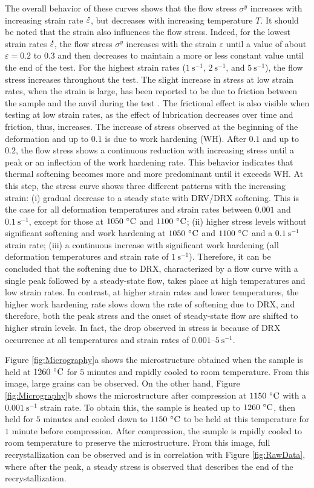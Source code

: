 \documentclass[metals,article,accept,pdftex,moreauthors]{Definitions/mdpi}
\DeclareRobustCommand{\mdot}[1]{\accentset{\mbox{\bfseries .}}{#1}}
\DeclareRobustCommand{\ps}{\text{s}^{-1}}
\begin{document}
The overall behavior of these curves shows that the flow stress $\sigma^y$ increases with increasing strain rate $\mdot\varepsilon$, but decreases with increasing temperature $T$.
It should be noted that the strain also influences the flow stress.
Indeed, for the lowest strain rates $\mdot\varepsilon$, the flow stress $\sigma^y$ increases with the strain $\varepsilon$ until a value of about $\varepsilon=0.2$ to $0.3$ and then decreases to maintain a more or less constant value until the end of the test.
For the highest strain rates ($1~\ps$, $2~\ps$, and $5~\ps$), the flow stress increases throughout the test.
The slight increase in stress at low strain rates, when the strain is large, has been reported to be due to friction between the sample and the anvil during the test \cite{galos2022review}.
The frictional effect is also visible when testing at low strain rates, as the effect of lubrication decreases over time and friction, thus, increases.
The increase of stress observed at the beginning of the deformation and up to $0.1$ is due to work hardening (WH).
After $0.1$ and up to $0.2$, the flow stress shows a continuous reduction with increasing stress until a peak or an inflection of the work hardening rate.
This behavior indicates that thermal softening becomes more and more predominant until it exceeds WH.
At this step, the stress curve shows three different patterns with the increasing strain: (i) gradual decrease to a steady state with DRV/DRX softening.
This is the case for all deformation temperatures and strain rates between $0.001$ and $0.1~\ps$, except for those at $1050~\celsius$ and $1100~\celsius$; (ii) higher stress levels without significant softening and work hardening at $1050~\celsius$ and $1100~\celsius$ and a $0.1~\ps$ strain rate; (iii) a continuous increase with significant work hardening (all deformation temperatures and strain rate of $1~\ps$).
Therefore, it can be concluded that the softening due to DRX, characterized by a flow curve with a single peak followed by a steady-state flow, takes place at high temperatures and low strain rates.
In contrast, at higher strain rates and lower temperatures, the higher work hardening rate slows down the rate of softening due to DRX, and therefore, both the peak stress and the onset of steady-state flow are shifted to higher strain levels.
In fact, the drop observed in
stress is because of DRX occurrence at all temperatures and strain rates of $0.001$--$5~\ps$.

Figure \ref{fig:Micrography}a shows the microstructure obtained when the sample is held at $1260~\celsius$ for $5$ minutes and rapidly cooled to room temperature. From this image, large grains can be observed.
On the other hand, Figure \ref{fig:Micrography}b shows the microstructure after compression at $1150~\celsius$ with a $0.001~\ps$ strain rate.
To obtain this, the sample is heated up to $1260~\celsius$, then held for $5$ minutes and cooled down to $1150~\celsius$ to be held at this temperature for $1$ minute before compression.
After compression, the sample is rapidly cooled to room temperature to preserve the microstructure.
From this image, full recrystallization can be observed and is in correlation with Figure \ref{fig:RawData}, where after the peak, a steady stress is observed that describes the end of the recrystallization.
\end{document}
